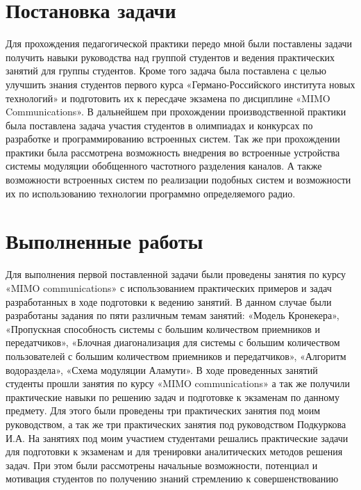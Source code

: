 \documentclass
[   twoside=false,    
    fontsize=14pt,     
    DIV=15,           
    BCOR=17mm,         
    headsepline, 
    footsepline, 
    open=right,        
    paper=a4,          
    abstract=true,     
    listof=totoc,     
    bibliography=totoc,
    titlepage,       
    headinclude=true,  
    footinclude=false, 
    numbers=noenddot   
]   {scrreprt}      %
\begin{document}
\chapter{Постановка задачи}
Для прохождения педагогической практики передо мной были поставлены задачи получить навыки руководства над группой студентов и ведения практических занятий для группы студентов.  
Кроме того задача была поставлена с целью улучшить знания студентов первого курса «Германо-Российского института новых технологий» и подготовить их к пересдаче экзамена по дисциплине «MIMO Communications»\cite{Book10}\cite{Book11}\cite{Book16}\cite{Book66}\cite{Book2}\cite{Book20}\cite{Book25}. 
В дальнейшем при прохождении производственной практики была поставлена задача участия студентов в олимпиадах и конкурсах по разработке и программированию встроенных систем. Так же при прохождении практики была рассмотрена возможность внедрения во встроенные устройства системы модуляции обобщенного частотного разделения каналов. А также возможности встроенных систем по реализации подобных систем и возможности их по использованию технологии программно определяемого радио.
\chapter{Выполненные работы}
Для выполнения первой поставленной задачи были проведены занятия по курсу «MIMO communications» с использованием практических примеров и задач разработанных в ходе подготовки к ведению занятий.  В данном случае были разработаны задания по пяти различным темам занятий: «Модель Кронекера»\cite{Book26}\cite{Book27}\cite{Book28}, «Пропускная способность системы с большим количеством приемников и передатчиков»\cite{Book29}\cite{Book30}\cite{Book31}, «Блочная диагонализация для системы с большим количеством пользователей с большим количеством приемников и передатчиков»\cite{Book32}\cite{Book33}\cite{Book34}, «Алгоритм водораздела»\cite{Book35}\cite{Book36}\cite{Book37}, «Схема модуляции Аламути»\cite{Book38}\cite{Book39}\cite{Book40}. 
В ходе проведенных занятий студенты прошли занятия по курсу «MIMO communications» а так же получили практические навыки по решению задач и подготовке к экзаменам по данному предмету. Для этого были проведены три практических занятия под моим руководством, а так же три практических занятия под руководством Подкуркова И.А. На занятиях под моим участием студентами решались практические задачи для подготовки к экзаменам и для тренировки аналитических методов решения задач. При этом были рассмотрены начальные возможности, потенциал и мотивация студентов по получению знаний стремлению к совершенствованию 
\end{document}
